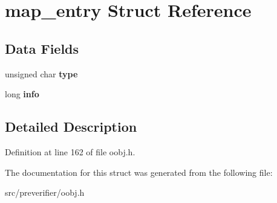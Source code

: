 \section{map\_\-entry Struct Reference}
\label{structmap__entry}
\subsection*{Data Fields}
\begin{DoxyCompactItemize}
\item 
unsigned char {\bfseries type}\label{structmap__entry_ad82eff37c185c474885c8b23f55441f1}

\item 
long {\bfseries info}\label{structmap__entry_a704f16e97e7f0050ad11236c8abb7084}

\end{DoxyCompactItemize}


\subsection{Detailed Description}


Definition at line 162 of file oobj.h.



The documentation for this struct was generated from the following file:\begin{DoxyCompactItemize}
\item 
src/preverifier/oobj.h\end{DoxyCompactItemize}
